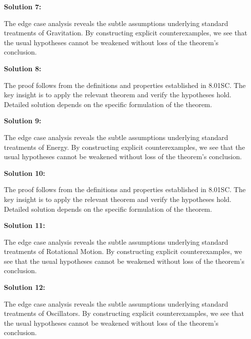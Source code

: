 \documentclass[12pt,a4paper]{exam}
\begin{document}
\vspace{0.5cm}

\textbf{Solution 7:}

The edge case analysis reveals the subtle assumptions underlying standard treatments of Gravitation. By constructing explicit counterexamples, we see that the usual hypotheses cannot be weakened without loss of the theorem's conclusion.

\vspace{0.5cm}

\textbf{Solution 8:}

The proof follows from the definitions and properties established in 8.01SC. The key insight is to apply the relevant theorem and verify the hypotheses hold. Detailed solution depends on the specific formulation of the theorem.

\vspace{0.5cm}

\textbf{Solution 9:}

The edge case analysis reveals the subtle assumptions underlying standard treatments of Energy. By constructing explicit counterexamples, we see that the usual hypotheses cannot be weakened without loss of the theorem's conclusion.

\vspace{0.5cm}

\textbf{Solution 10:}

The proof follows from the definitions and properties established in 8.01SC. The key insight is to apply the relevant theorem and verify the hypotheses hold. Detailed solution depends on the specific formulation of the theorem.

\vspace{0.5cm}

\textbf{Solution 11:}

The edge case analysis reveals the subtle assumptions underlying standard treatments of Rotational Motion. By constructing explicit counterexamples, we see that the usual hypotheses cannot be weakened without loss of the theorem's conclusion.

\vspace{0.5cm}

\textbf{Solution 12:}

The edge case analysis reveals the subtle assumptions underlying standard treatments of Oscillators. By constructing explicit counterexamples, we see that the usual hypotheses cannot be weakened without loss of the theorem's conclusion.
\end{document}
